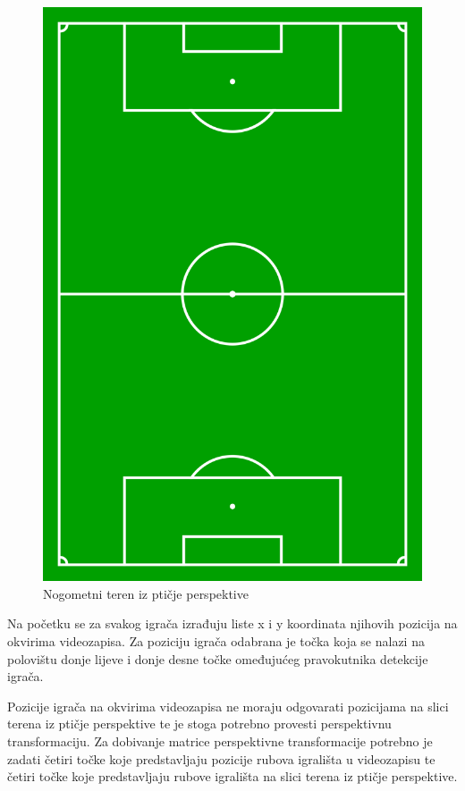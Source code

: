 \documentclass[times, utf8, seminar, numeric]{fer}
\begin{document}
\begin{figure}
	\centering
	\includegraphics[scale=0.15]{slike/pitch.png}
	\caption {Nogometni teren iz ptičje perspektive}
	\label{fig:pitch}	
\end{figure}

Na početku se za svakog igrača izrađuju liste x i y koordinata njihovih pozicija na okvirima videozapisa. 
Za poziciju igrača odabrana je točka koja se nalazi na polovištu donje lijeve i donje desne točke omeđujućeg pravokutnika detekcije igrača.

Pozicije igrača na okvirima videozapisa ne moraju odgovarati pozicijama na slici terena iz ptičje perspektive te je stoga potrebno provesti perspektivnu transformaciju.  
Za dobivanje matrice perspektivne transformacije potrebno je zadati četiri točke koje predstavljaju pozicije rubova igrališta u videozapisu te četiri točke koje predstavljaju rubove igrališta na slici terena iz ptičje perspektive. 
\end{document}
